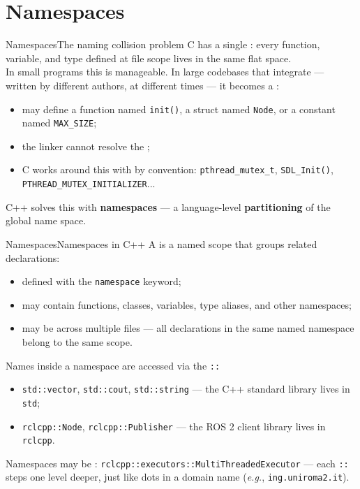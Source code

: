
\section{Namespaces}
\graphicspath{{figs/section6/}}

\begin{frame}{Namespaces}{The naming collision problem}
	\justifying
	C has a single : every function, variable, and type defined at file scope lives in the same flat space.\\
	\bigskip
	In small programs this is manageable. In large codebases that integrate  — written by different authors, at different times — it becomes a :
	\begin{itemize}
		\item {} may define a function named \texttt{init()}, a struct named \texttt{Node}, or a constant named \texttt{MAX\_SIZE};
		\item the linker cannot resolve the ;
		\item C works around this with  by convention: \texttt{pthread\_mutex\_t}, \texttt{SDL\_Init()}, \texttt{PTHREAD\_MUTEX\_INITIALIZER}...
	\end{itemize}
	\bigskip
	\begin{block}{}
		\centering
		C++ solves this with \textbf{namespaces} — a language-level \textbf{partitioning} of the global name space.
	\end{block}
\end{frame}
\begin{frame}{Namespaces}{Namespaces in C++}
	\justifying
	A  is a named scope that groups related declarations:
	\begin{itemize}
		\item defined with the \texttt{namespace} keyword;
		\item may contain functions, classes, variables, type aliases, and other namespaces;
		\item may be  across multiple files — all declarations in the same named namespace belong to the same scope.
	\end{itemize}
	\bigskip
	Names inside a namespace are accessed via the  \texttt{::}
	\begin{itemize}
		\item \texttt{std::vector}, \texttt{std::cout}, \texttt{std::string} — the C++ standard library lives in \texttt{std};
		\item \texttt{rclcpp::Node}, \texttt{rclcpp::Publisher} — the ROS 2 client library lives in \texttt{rclcpp}.
	\end{itemize}
	\bigskip
	Namespaces may be : \texttt{rclcpp::executors::MultiThreadedExecutor} — each \texttt{::} steps one level deeper, just like dots in a domain name (\emph{e.g.}, \texttt{ing.uniroma2.it}).
\end{frame}
